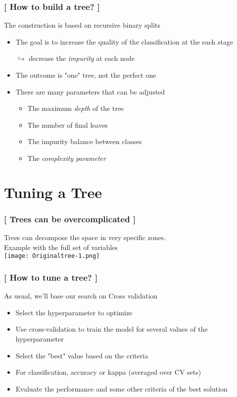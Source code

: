 \documentclass[xcolor=x11names,compress, handhouts]{beamer}
\renewcommand{\(}{\begin{columns}}
\renewcommand{\)}{\end{columns}}
\newcommand{\<}[1]{\begin{column}{#1}}
\renewcommand{\>}{\end{column}}
\begin{document}
\begin{frame}
\frametitle{\textcolor{brique}{[ How to build a tree? ]}}
The construction is based on recursive binary splits
\pause
\begin{itemize}[<+->]
    \item The goal is to increase the quality of the classification at the each stage 
    \item[$\hookrightarrow$] decrease the \textit{impurity} at each node
    \item The outcome is "one" tree, not the perfect one 
    \item  There are many parameters that can be adjusted
    \begin{itemize}[<+->]
        \item The maximum \textit{depth} of the tree
        \item The number of final leaves
        \item The impurity balance between classes
        \item The \textit{complexity parameter}   
    \end{itemize}
\end{itemize}
\end{frame}

\section{Tuning a Tree}

\begin{frame}
\frametitle{\textcolor{brique}{[ Trees can be overcomplicated ]}}
Trees can decompose the space in very specific zones.\\
 Example with  the full set of variables\\
 
\texttt{[image: Originaltree-1.png]}
\end{frame}


\begin{frame}
\frametitle{\textcolor{brique}{[ How to tune a tree? ]}}
As usual, we'll base our search on Cross validation
\pause
\begin{itemize}[<+->]
    \item Select the hyperparameter to optimize
    \item Use cross-validation to train the model for several values of the hyperparameter
    \item Select the "best" value based on the criteria
    \item For classification, accuracy or kappa (averaged over CV sets)  
    \item Evaluate the performance and some other criteria of the best solution
\end{itemize}
\end{frame}


\end{document}
